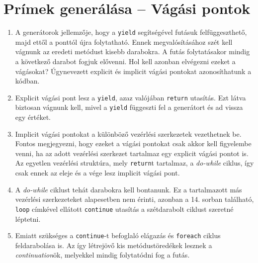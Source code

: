 \documentclass[12pt, a4paper]{article}
\begin{document}
\section{Prímek generálása -- Vágási pontok}

\begin{enumerate}
   \item
   A generátorok jellemzője, hogy a \texttt{yield} segítségével futásuk felfüggeszthető, majd ettől a ponttól újra folytatható. Ennek megvalósításához szét kell vágnunk az eredeti metódust kisebb darabokra. A futás folytatásakor mindig a következő darabot fogjuk elővenni. Hol kell azonban elvégezni ezeket a vágásokat? Úgynevezett explicit és implicit vágási pontokat azonosíthatunk a kódban.
   \item
   Explicit vágási pont lesz a \texttt{yield}, azaz valójában \texttt{return} utasítás. Ezt látva biztosan vágnunk kell, mivel a \texttt{yield} függeszti fel a generátort és ad vissza egy értéket.
   \item
   Implicit vágási pontokat a különböző vezérlési szerkezetek vezethetnek be. Fontos megjegyezni, hogy ezeket a vágási pontokat csak akkor kell figyelembe venni, ha az adott vezérlési szerkezet tartalmaz egy explicit vágási pontot is. Az egyetlen vezérlési struktúra, mely \texttt{return}t tartalmaz, a \textit{do-while} ciklus, így csak ennek az eleje és a vége lesz implicit vágási pont.
   \item
   A \textit{do-while} ciklust tehát darabokra kell bontanunk. Ez a tartalmazott más vezérlési szerkezeteket alapesetben nem érinti, azonban a 14. sorban található, \texttt{loop} címkével ellátott \texttt{continue} utasítás a szétdarabolt ciklust szeretné léptetni.
   \item
   Emiatt szükséges a \texttt{continue}-t befoglaló elágazás és \texttt{foreach} ciklus feldarabolása is. Az így létrejövő kis metódustöredékek lesznek a \textit{continuation}ök, melyekkel mindig folytatódni fog a futás.
\end{enumerate}

\section{}
\end{document}
